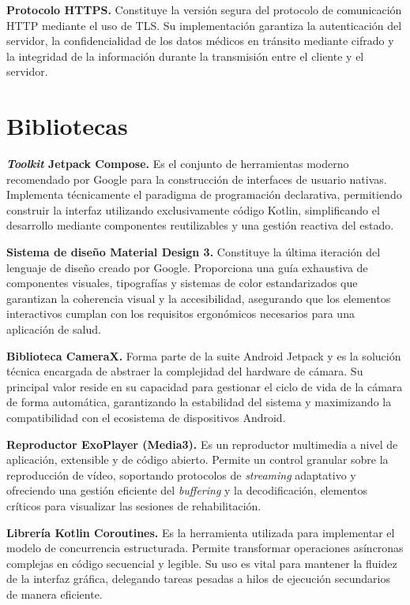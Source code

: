 \textbf{Protocolo HTTPS.} Constituye la versión segura del protocolo de comunicación HTTP mediante el uso de TLS. Su implementación garantiza la autenticación del servidor, la confidencialidad de los datos médicos en tránsito mediante cifrado y la integridad de la información durante la transmisión entre el cliente y el servidor.

\section{Bibliotecas}

\textbf{\textit{Toolkit} Jetpack Compose.} Es el conjunto de herramientas moderno recomendado por Google para la construcción de interfaces de usuario nativas. Implementa técnicamente el paradigma de programación declarativa, permitiendo construir la interfaz utilizando exclusivamente código Kotlin, simplificando el desarrollo mediante componentes reutilizables y una gestión reactiva del estado.  \cite{jetpack_compose_ref}

\textbf{Sistema de diseño Material Design 3.} Constituye la última iteración del lenguaje de diseño creado por Google. Proporciona una guía exhaustiva de componentes visuales, tipografías y sistemas de color estandarizados que garantizan la coherencia visual y la accesibilidad, asegurando que los elementos interactivos cumplan con los requisitos ergonómicos necesarios para una aplicación de salud.  \cite{material_design_3}

\textbf{Biblioteca CameraX.} Forma parte de la suite Android Jetpack y es la solución técnica encargada de abstraer la complejidad del hardware de cámara. Su principal valor reside en su capacidad para gestionar el ciclo de vida de la cámara de forma automática, garantizando la estabilidad del sistema y maximizando la compatibilidad con el ecosistema de dispositivos Android. 

\textbf{Reproductor ExoPlayer (Media3).} Es un reproductor multimedia a nivel de aplicación, extensible y de código abierto. Permite un control granular sobre la reproducción de vídeo, soportando protocolos de \textit{streaming} adaptativo y ofreciendo una gestión eficiente del \textit{buffering} y la decodificación, elementos críticos para visualizar las sesiones de rehabilitación.  \cite{exoplayer_ref}

\textbf{Librería Kotlin Coroutines.} Es la herramienta utilizada para implementar el modelo de concurrencia estructurada. Permite transformar operaciones asíncronas complejas en código secuencial y legible. Su uso es vital para mantener la fluidez de la interfaz gráfica, delegando tareas pesadas a hilos de ejecución secundarios de manera eficiente.  \cite{kotlin_coroutines_ref}

